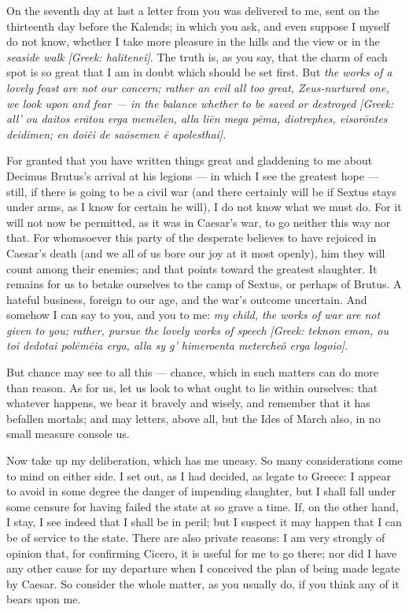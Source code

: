 

 On the seventh day at last a letter from you was delivered to me, sent on the thirteenth day before the Kalends; in which you ask, and even suppose I myself do not know, whether I take more pleasure in the hills and the view or in the \textit{seaside walk} \textit{[Greek: halitene\^i]}. The truth is, as you say, that the charm of each spot is so great that I am in doubt which should be set first. But \textit{the works of a lovely feast are not our concern; rather an evil all too great, Zeus-nurtured one, we look upon and fear --- in the balance whether to be saved or destroyed} \textit{[Greek: all' ou daitos er\=atou erga mem\=elen, alla li\=en mega p\=ema, diotrephes, eisor\=ontes deidimen; en doi\^ei de sa\=osemen \=e apolesthai]}.

 For granted that you have written things great and gladdening to me about Decimus Brutus's arrival at his legions --- in which I see the greatest hope --- still, if there is going to be a civil war (and there certainly will be if Sextus stays under arms, as I know for certain he will), I do not know what we must do. For it will not now be permitted, as it was in Caesar's war, to go neither this way nor that. For whomsoever this party of the desperate believes to have rejoiced in Caesar's death (and we all of us bore our joy at it most openly), him they will count among their enemies; and that points toward the greatest slaughter. It remains for us to betake ourselves to the camp of Sextus, or perhaps of Brutus. A hateful business, foreign to our age, and the war's outcome uncertain. And somehow I can say to you, and you to me: \textit{my child, the works of war are not given to you; rather, pursue the lovely works of speech} \textit{[Greek: teknon emon, ou toi dedotai pol\=em\=eia erga, alla sy g' himeroenta meterche\^o erga logoio]}.

 But chance may see to all this --- chance, which in such matters can do more than reason. As for us, let us look to what ought to lie within ourselves: that whatever happens, we bear it bravely and wisely, and remember that it has befallen mortals; and may letters, above all, but the Ides of March also, in no small measure console us.

 Now take up my deliberation, which has me uneasy. So many considerations come to mind on either side. I set out, as I had decided, as legate to Greece: I appear to avoid in some degree the danger of impending slaughter, but I shall fall under some censure for having failed the state at so grave a time. If, on the other hand, I stay, I see indeed that I shall be in peril; but I suspect it may happen that I can be of service to the state. There are also private reasons: I am very strongly of opinion that, for confirming Cicero, it is useful for me to go there; nor did I have any other cause for my departure when I conceived the plan of being made legate by Caesar. So consider the whole matter, as you usually do, if you think any of it bears upon me.

